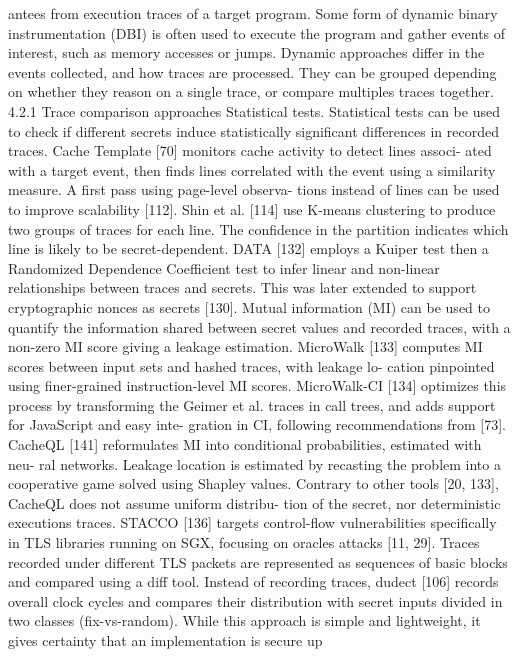 antees from execution traces of a target program. Some form of
dynamic binary instrumentation (DBI) is often used to execute the
program and gather events of interest, such as memory accesses or
jumps. Dynamic approaches differ in the events collected, and how
traces are processed. They can be grouped depending on whether
they reason on a single trace, or compare multiples traces together.
4.2.1
Trace comparison approaches
Statistical tests. Statistical tests can be used to check if different
secrets induce statistically significant differences in recorded traces.
Cache Template [70] monitors cache activity to detect lines associ-
ated with a target event, then finds lines correlated with the event
using a similarity measure. A first pass using page-level observa-
tions instead of lines can be used to improve scalability [112]. Shin
et al. [114] use K-means clustering to produce two groups of traces
for each line. The confidence in the partition indicates which line
is likely to be secret-dependent. DATA [132] employs a Kuiper test
then a Randomized Dependence Coefficient test to infer linear and
non-linear relationships between traces and secrets. This was later
extended to support cryptographic nonces as secrets [130].
Mutual information (MI) can be used to quantify the information
shared between secret values and recorded traces, with a non-zero
MI score giving a leakage estimation. MicroWalk [133] computes
MI scores between input sets and hashed traces, with leakage lo-
cation pinpointed using finer-grained instruction-level MI scores.
MicroWalk-CI [134] optimizes this process by transforming the
Geimer et al.
traces in call trees, and adds support for JavaScript and easy inte-
gration in CI, following recommendations from [73]. CacheQL [141]
reformulates MI into conditional probabilities, estimated with neu-
ral networks. Leakage location is estimated by recasting the problem
into a cooperative game solved using Shapley values. Contrary to
other tools [20, 133], CacheQL does not assume uniform distribu-
tion of the secret, nor deterministic executions traces.
STACCO [136] targets control-flow vulnerabilities specifically in
TLS libraries running on SGX, focusing on oracles attacks [11, 29].
Traces recorded under different TLS packets are represented as
sequences of basic blocks and compared using a diff tool.
Instead of recording traces, dudect [106] records overall clock
cycles and compares their distribution with secret inputs divided
in two classes (fix-vs-random). While this approach is simple and
lightweight, it gives certainty that an implementation is secure up
